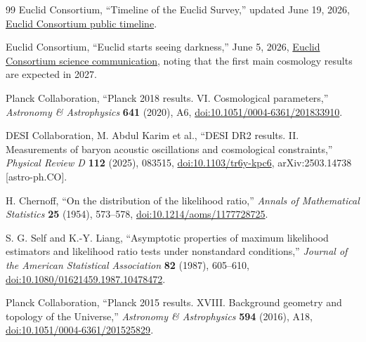 \documentclass[11pt,a4paper]{article}
\numberwithin{equation}{section}
\theoremstyle{definition}
\theoremstyle{plain}
\theoremstyle{remark}
\begin{document}
\begin{thebibliography}{99}
Euclid Consortium, ``Timeline of the Euclid Survey,'' updated June 19, 2026, \href{https://www.euclid-ec.org/public/timeline/}{Euclid Consortium public timeline}.

Euclid Consortium, ``Euclid starts seeing darkness,'' June 5, 2026, \href{https://www.euclid-ec.org/euclid-starts-seeing-darkness/}{Euclid Consortium science communication}, noting that the first main cosmology results are expected in 2027.

Planck Collaboration, ``Planck 2018 results. VI. Cosmological parameters,'' \emph{Astronomy \& Astrophysics} \textbf{641} (2020), A6, \href{https://doi.org/10.1051/0004-6361/201833910}{doi:10.1051/0004-6361/201833910}.

DESI Collaboration, M. Abdul Karim et al., ``DESI DR2 results. II. Measurements of baryon acoustic oscillations and cosmological constraints,'' \emph{Physical Review D} \textbf{112} (2025), 083515, \href{https://doi.org/10.1103/tr6y-kpc6}{doi:10.1103/tr6y-kpc6}, arXiv:2503.14738 [astro-ph.CO].

H. Chernoff, ``On the distribution of the likelihood ratio,'' \emph{Annals of Mathematical Statistics} \textbf{25} (1954), 573--578, \href{https://doi.org/10.1214/aoms/1177728725}{doi:10.1214/aoms/1177728725}.

S. G. Self and K.-Y. Liang, ``Asymptotic properties of maximum likelihood estimators and likelihood ratio tests under nonstandard conditions,'' \emph{Journal of the American Statistical Association} \textbf{82} (1987), 605--610, \href{https://doi.org/10.1080/01621459.1987.10478472}{doi:10.1080/01621459.1987.10478472}.

Planck Collaboration, ``Planck 2015 results. XVIII. Background geometry and topology of the Universe,'' \emph{Astronomy \& Astrophysics} \textbf{594} (2016), A18, \href{https://doi.org/10.1051/0004-6361/201525829}{doi:10.1051/0004-6361/201525829}.

\end{thebibliography}
\end{document}

